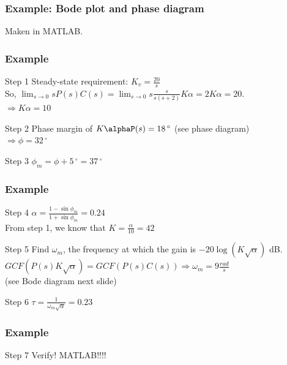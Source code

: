 \begin{frame}
\frametitle{Example: Bode plot and phase diagram}
Maken in MATLAB.
\end{frame}

\begin{frame}
\frametitle{Example}
\begin{block}{Step 1}
Steady-state requirement: $K_v = \frac{20}{s}$ \\
So, $\lim_{s \to 0} sP(s)C(s) = \lim_{s \to 0} s\frac{s}{s(s+2)}K\alpha = 2K\alpha = 20$. \\
$\Rightarrow K\alpha = 10$
\end{block}
\begin{block}{Step 2}
Phase margin of $K\alphaP(s) = 18\,^{\circ}$ (see phase diagram) \\
$\Rightarrow \phi = 32\,^{\circ}$
\end{block}
\begin{block}{Step 3}
$\phi_m = \phi + 5\,^{\circ} = 37\,^{\circ}$
\end{block}
\end{frame}

\begin{frame}
	\frametitle{Example}
	\begin{block}{Step 4}
	 $\alpha = \frac{1 - \sin \phi_m}{1 + \sin \phi_m} = 0.24$ \\
	 From step 1, we know that $K = \frac{\alpha}{10} = 42$
	\end{block}
	\begin{block}{Step 5}
	Find $\omega_m$, the frequency at which the gain is $-20\log(K\sqrt{\alpha})$ dB. 
	$GCF(P(s)K\sqrt{\alpha}) = GCF(P(s)C(s)) \Rightarrow \omega_m = 9 \frac{rad}{s}$ \\
	(see Bode diagram next slide)
	\end{block}
	\begin{block}{Step 6}
	$\tau = \frac{1}{\omega_m\sqrt{\alpha}} = 0.23$
	\end{block}
\end{frame}

\begin{frame}
	\frametitle{Example}
	\begin{block}{Step 7}
	Verify! MATLAB!!!!
	\end{block}
\end{frame}

